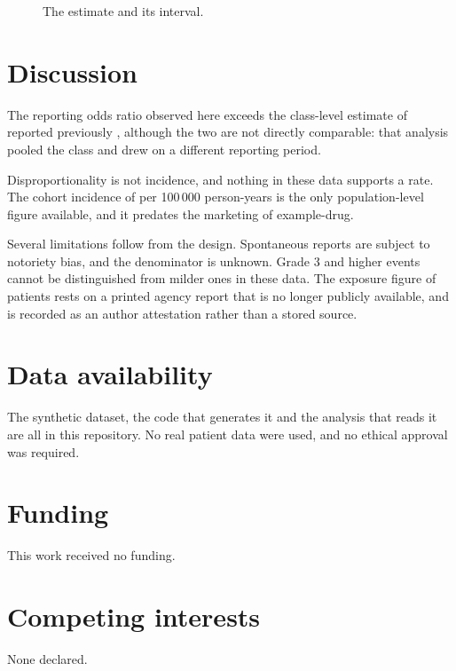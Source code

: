 \documentclass{article}
\begin{document}
\begin{table}\caption{The counts the estimate was computed from.}\label{tab:counts}\end{table}

\begin{figure}\caption{The estimate and its interval.}\label{fig:forest}\end{figure}

\section{Discussion}

The reporting odds ratio observed here exceeds the class-level estimate of
 reported previously \cite{fictionalClassSignal2019}, although the
two are not directly comparable: that analysis pooled the class and drew on a different
reporting period.

Disproportionality is not incidence, and nothing in these data supports a rate. The cohort
incidence of  per 100\,000 person-years
\cite{fictionalHepaticCohort2021} is the only population-level figure available, and it
predates the marketing of example-drug.

Several limitations follow from the design. Spontaneous reports are subject to notoriety
bias, and the denominator is unknown. Grade 3 and higher events cannot be distinguished
from milder ones in these data. The exposure figure of
 patients rests on a printed agency report that is no
longer publicly available, and is recorded as an author attestation rather than a stored
source.

\section{Data availability}

The synthetic dataset, the code that generates it and the analysis that reads it are all in
this repository. No real patient data were used, and no ethical approval was required.

\section{Funding}

This work received no funding.

\section{Competing interests}

None declared.



\end{document}
